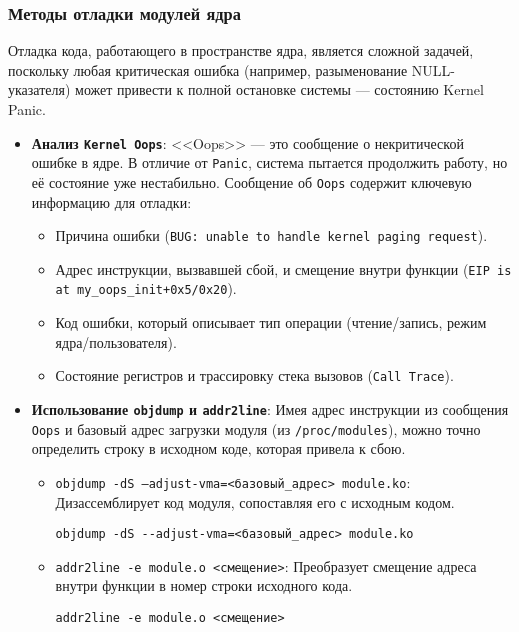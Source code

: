 \subsubsection{Методы отладки модулей ядра}
Отладка кода, работающего в пространстве ядра, является сложной задачей, поскольку любая критическая ошибка (например, разыменование NULL-указателя) может привести к полной остановке системы — состоянию Kernel Panic.

\begin{itemize}
    \item \textbf{Анализ \texttt{Kernel Oops}}: <<Oops>> --- это сообщение о некритической ошибке в ядре. В отличие от \texttt{Panic}, система пытается продолжить работу, но её состояние уже нестабильно. Сообщение об \texttt{Oops} содержит ключевую информацию для отладки:
    \begin{itemize}
        \item Причина ошибки (\texttt{BUG: unable to handle kernel paging request}).
        \item Адрес инструкции, вызвавшей сбой, и смещение внутри функции (\texttt{EIP is at my\_oops\_init+0x5/0x20}).
        \item Код ошибки, который описывает тип операции (чтение/запись, режим ядра/пользователя).
        \item Состояние регистров и трассировку стека вызовов (\texttt{Call Trace}).
    \end{itemize}

    \item \textbf{Использование \texttt{objdump} и \texttt{addr2line}}: Имея адрес инструкции из сообщения \texttt{Oops} и базовый адрес загрузки модуля (из \texttt{/proc/modules}), можно точно определить строку в исходном коде, которая привела к сбою.
    \begin{itemize}
        \item \texttt{objdump -dS --adjust-vma=<базовый\_адрес> module.ko}: Дизассемблирует код модуля, сопоставляя его с исходным кодом.
        \begin{verbatim}
objdump -dS --adjust-vma=<базовый_адрес> module.ko
        \end{verbatim}
        \item \texttt{addr2line -e module.o <смещение>}: Преобразует смещение адреса внутри функции в номер строки исходного кода.
        \begin{verbatim}
addr2line -e module.o <смещение>
        \end{verbatim}
    \end{itemize}


\end{itemize}
